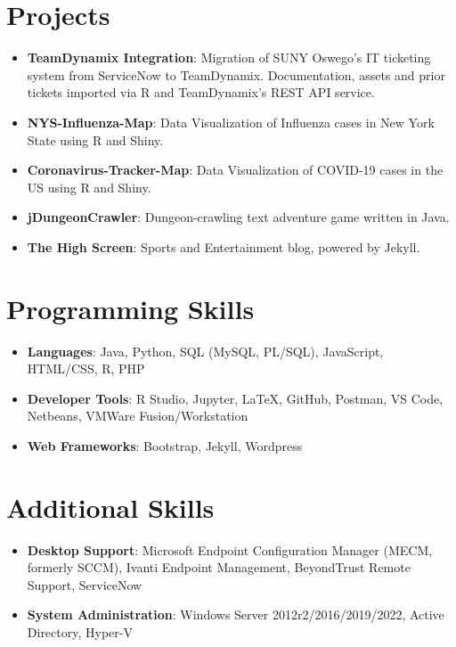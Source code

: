 \documentclass[letterpaper,11pt]{article}
\newcommand{\resumeItem}[2]{
  \item\small{
    \textbf{#1}{: #2 \vspace{-2pt}}
  }
}
\newcommand{\resumeSubItem}[2]{\resumeItem{#1}{#2}\vspace{-4pt}}
\newcommand{\resumeSubHeadingListStart}{\begin{itemize}[leftmargin=*]}
\newcommand{\resumeSubHeadingListEnd}{\end{itemize}}
\begin{document}
\section{Projects}
  	\resumeSubHeadingListStart
	  	\resumeSubItem{TeamDynamix Integration}{Migration of SUNY Oswego's IT ticketing system from ServiceNow to TeamDynamix. Documentation, assets and prior tickets imported via R and TeamDynamix's REST API service.}
   		\resumeSubItem{NYS-Influenza-Map}{Data Visualization of Influenza cases in New York State using R and Shiny.}
    	\resumeSubItem{Coronavirus-Tracker-Map}{Data Visualization of COVID-19 cases in the US using R and Shiny.}
   		\resumeSubItem{jDungeonCrawler}{Dungeon-crawling text adventure game written in Java.}
    	\resumeSubItem{The High Screen}{Sports and Entertainment blog, powered by Jekyll.}
  	\resumeSubHeadingListEnd

\section{Programming Skills}
  	\resumeSubHeadingListStart
    	\resumeSubItem{Languages}{Java, Python, SQL (MySQL, PL/SQL), JavaScript, HTML/CSS, R, PHP} 
   		\resumeSubItem{Developer Tools}{R Studio, Jupyter, LaTeX, GitHub, Postman, VS Code, Netbeans, VMWare Fusion/Workstation}
    	\resumeSubItem{Web Frameworks}{Bootstrap,  Jekyll, Wordpress} 
  	\resumeSubHeadingListEnd

\section{Additional Skills}
  	\resumeSubHeadingListStart
    	\resumeSubItem{Desktop Support}{Microsoft Endpoint Configuration Manager (MECM, formerly SCCM), Ivanti Endpoint Management, BeyondTrust Remote Support, ServiceNow}
   		\resumeSubItem{System Administration}{Windows Server 2012r2/2016/2019/2022, Active Directory, Hyper-V}
  	\resumeSubHeadingListEnd

\end{document}
